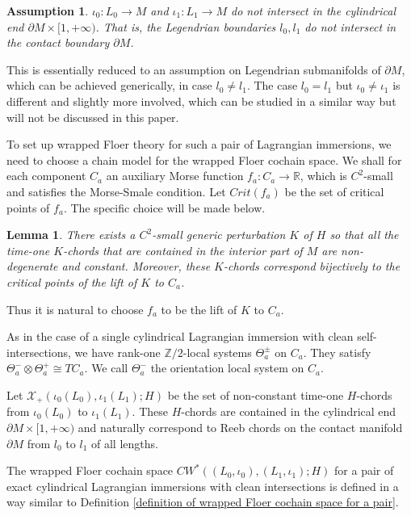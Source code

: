 \documentclass{amsart}
\newtheorem{lemma}[theorem]{Lemma}
\newtheorem{assumption}[theorem]{Assumption}
\numberwithin{equation}{section}
\numberwithin{figure}{section}
\begin{document}
\begin{assumption}
	$\iota_{0}: L_{0} \to M$ and $\iota_{1}: L_{1} \to M$ do not intersect in the cylindrical end $\partial M \times [1, +\infty)$. That is, the Legendrian boundaries $l_{0}, l_{1}$ do not intersect in the contact boundary $\partial M$.
\end{assumption}

	This is essentially reduced to an assumption on Legendrian submanifolds of $\partial M$, which can be achieved generically, in case $l_{0} \neq l_{1}$. The case $l_{0} = l_{1}$ but $\iota_{0} \neq \iota_{1}$ is different and slightly more involved, which can be studied in a similar way but will not be discussed in this paper. \par
	To set up wrapped Floer theory for such a pair of Lagrangian immersions, we need to choose a chain model for the wrapped Floer cochain space. We shall for each component $C_{a}$ an auxiliary Morse function $f_{a}: C_{a} \to \mathbb{R}$, which is $C^{2}$-small and satisfies the Morse-Smale condition. Let $Crit(f_{a})$ be the set of critical points of $f_{a}$. The specific choice will be made below. \par

\begin{lemma}
	There exists a $C^{2}$-small generic perturbation $K$ of $H$ so that all the time-one $K$-chords that are contained in the interior part of $M$ are non-degenerate and constant. Moreover, these $K$-chords correspond bijectively to the critical points of the lift of $K$ to $C_{a}$.
\end{lemma}

	Thus it is natural to choose $f_{a}$ to be the lift of $K$ to $C_{a}$. \par
	As in the case of a single cylindrical Lagrangian immersion with clean self-intersections, we have rank-one $\mathbb{Z}/2$-local systems $\Theta_{a}^{\pm}$ on $C_{a}$. They satisfy $\Theta_{a}^{-} \otimes \Theta_{a}^{+} \cong TC_{a}$. We call $\Theta_{a}^{-}$ the orientation local system on $C_{a}$. \par
	Let $\mathcal{X}_{+}(\iota_{0}(L_{0}), \iota_{1}(L_{1}); H)$ be the set of non-constant time-one $H$-chords from $\iota_{0}(L_{0})$ to $\iota_{1}(L_{1})$. These $H$-chords are contained in the cylindrical end $\partial M \times [1, +\infty)$ and naturally correspond to Reeb chords on the contact manifold $\partial M$ from $l_{0}$ to $l_{1}$ of all lengths. \par
	The wrapped Floer cochain space $CW^{*}((L_{0}, \iota_{0}), (L_{1}, \iota_{1}); H)$ for a pair of exact cylindrical Lagrangian immersions with clean intersections is defined in a way similar to Definition  \ref{definition of wrapped Floer cochain space for a pair}. \par
\end{document}
